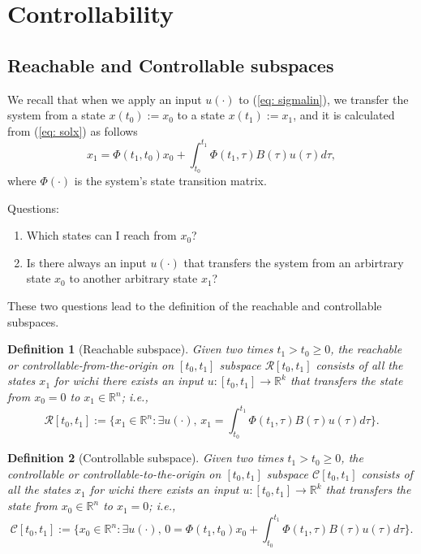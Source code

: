 \documentclass[11pt,a4paper,titlepage]{article}
\newtheorem{definition}{Definition}
\begin{document}
\section{Controllability}
\subsection{Reachable and Controllable subspaces}
We recall that when we apply an input $u(\cdot)$ to (\ref{eq: sigmalin}), we transfer the system from a state $x(t_0):=x_0$ to a state $x(t_1):=x_1$, and it is calculated from (\ref{eq: solx}) as follows
\begin{equation}
	x_1 = \Phi(t_1,t_0)x_0 + \int_{t_0}^{t_1} \Phi(t_1,\tau)B(\tau)u(\tau)d\tau,
\end{equation}
where $\Phi(\cdot)$ is the system's state transition matrix.

Questions: 
\begin{enumerate}
	\item Which states can I reach from $x_0$?
	\item Is there always an input $u(\cdot)$ that transfers the system from an arbirtrary state $x_0$ to another arbitrary state $x_1$?
\end{enumerate}

These two questions lead to the definition of the reachable and controllable subspaces.

\begin{definition}[Reachable subspace]
	Given two times $t_1>t_0\geq 0$, the reachable or controllable-from-the-origin on $[t_0,t_1]$ subspace $\mathcal{R}[t_0,t_1]$ consists of all the states $x_1$ for wichi there exists an input $u:[t_0,t_1]\to \mathbb{R}^k$ that transfers the state from $x_0 = 0$ to $x_1 \in\mathbb{R}^n$; i.e.,
	\begin{equation}
		\mathcal{R}[t_0,t_1] := \Big\{x_1\in\mathbb{R}^n : \exists u(\cdot),\, x_1 = \int_{t_0}^{t_1} \Phi(t_1,\tau)B(\tau)u(\tau)d\tau \Big\}. \label{eq: rs}
	\end{equation}
\end{definition}

\begin{definition}[Controllable subspace]
	Given two times $t_1>t_0\geq 0$, the controllable or controllable-to-the-origin on $[t_0,t_1]$ subspace $\mathcal{C}[t_0,t_1]$ consists of all the states $x_1$ for wichi there exists an input $u:[t_0,t_1]\to \mathbb{R}^k$ that transfers the state from $x_0\in\mathbb{R}^n$ to $x_1 = 0$; i.e.,
	\begin{equation}
		\mathcal{C}[t_0,t_1] := \Big\{x_0\in\mathbb{R}^n : \exists u(\cdot),\, 0 = \Phi(t_1,t_0)x_0 + \int_{t_0}^{t_1} \Phi(t_1,\tau)B(\tau)u(\tau)d\tau \Big\}.
	\end{equation}
\end{definition}
\end{document}
